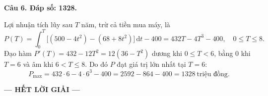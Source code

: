 \documentclass[12pt,a4paper]{article}
\newcommand{\loigiai}[1]{\par\medskip\Needspace{4\baselineskip}\noindent\textbf{#1}\par\nobreak}
\begin{document}
\loigiai{Câu 6. Đáp số: 1328.}
Lợi nhuận tích lũy sau $T$ năm, trừ cả tiền mua máy, là
\[
P(T)=\int_0^T\big[(500-4t^2)-(68+8t^2)\big]\,\mathrm dt-400
=432T-4T^3-400,\quad 0\leq T\leq8.
\]
Đạo hàm $P'(T)=432-12T^2=12(36-T^2)$ dương khi $0\leq T<6$, bằng $0$ khi $T=6$ và âm khi $6<T\leq8$. Do đó $P$ đạt giá trị lớn nhất tại $T=6$:
\[
P_{\max}=432\cdot6-4\cdot6^3-400
=2592-864-400=1328\ \text{triệu đồng}.
\]
\begin{center}\textbf{--- HẾT LỜI GIẢI ---}\end{center}
\end{document}
